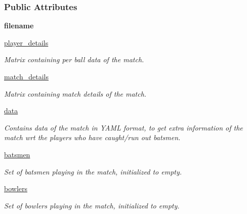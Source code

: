 \subsubsection*{Public Attributes}
\begin{DoxyCompactItemize}
\item 
\mbox{\label{classaccess_1_1Read_afc80365a54bec281993b7a257080b029}} 
{\bfseries filename}
\item 
\hyperlink{classaccess_1_1Read_a4682ffb3f43ec732d63d89d8ee78cc1a}{player\+\_\+details}
\begin{DoxyCompactList}\small\item\em Matrix containing per ball data of the match. \end{DoxyCompactList}\item 
\hyperlink{classaccess_1_1Read_afb6b007e7b4888e71b0aedc00e92708d}{match\+\_\+details}
\begin{DoxyCompactList}\small\item\em Matrix containing match details of the match. \end{DoxyCompactList}\item 
\hyperlink{classaccess_1_1Read_a5a7dbfc250ef34435c08e175135c7c90}{data}
\begin{DoxyCompactList}\small\item\em Contains data of the match in Y\+A\+ML format, to get extra information of the match wrt the players who have caught/run out batsmen. \end{DoxyCompactList}\item 
\mbox{\label{classaccess_1_1Read_ab6154e0bef5bd2a28c273032518a4323}} 
\hyperlink{classaccess_1_1Read_ab6154e0bef5bd2a28c273032518a4323}{batsmen}
\begin{DoxyCompactList}\small\item\em Set of batsmen playing in the match, initialized to empty. \end{DoxyCompactList}\item 
\mbox{\label{classaccess_1_1Read_a55d1e15ed23c47ad8f6b54d1341b5e36}} 
\hyperlink{classaccess_1_1Read_a55d1e15ed23c47ad8f6b54d1341b5e36}{bowlers}
\begin{DoxyCompactList}\small\item\em Set of bowlers playing in the match, initialized to empty. \end{DoxyCompactList}\item 

\end{DoxyCompactItemize}
